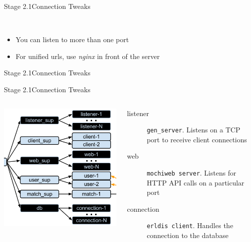 \documentclass[utf8,hyperref={colorlinks=true}]{beamer}
\begin{document}
\begin{frame}{Stage 2.1}{Connection Tweaks}
	\begin{description}
		\item<+->[Listeners]\ \\
			\begin{itemize}
				\item You can listen to more than one port
				\item For unified urls, use \emph{nginx} in front of the server
			\end{itemize}
	\end{description}
\end{frame}
\begin{frame}{Stage 2.1}{Connection Tweaks}
\listener
\end{frame}
\begin{frame}{Stage 2.1}{Connection Tweaks}
	\begin{columns}
			\begin{center}
				\includegraphics[height=.7\textheight]{img/architecture-2.png}
			\end{center}
			\begin{description}
				\item[listener]
					\texttt{gen\_server}. Listens on a TCP port to receive client connections
				\item[web]
					\texttt{mochiweb server}. Listens for HTTP API calls on a particular port
				\item[connection]
					\texttt{erldis client}. Handles the connection to the database
			\end{description}
	\end{columns}
\end{frame}
\end{document}
